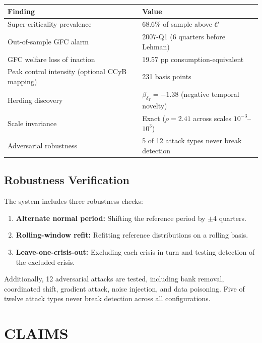 \documentclass[12pt,a4paper]{article}
\begin{document}
\begin{center}
\begin{tabular}{ll}
\toprule
\textbf{Finding} & \textbf{Value} \\
\midrule
Super-criticality prevalence & 68.6\% of sample above $\mathcal{C}$ \\
Out-of-sample GFC alarm & 2007-Q1 (6 quarters before Lehman) \\
GFC welfare loss of inaction & 19.57 pp consumption-equivalent \\
Peak control intensity (optional CCyB mapping) & 231 basis points \\
Herding discovery & $\beta_{\delta_T} = -1.38$ (negative temporal novelty) \\
Scale invariance & Exact ($\rho = 2.41$ across scales $10^{-3}$--$10^3$) \\
Adversarial robustness & 5 of 12 attack types never break detection \\
\bottomrule
\end{tabular}
\end{center}

\subsection{Robustness Verification}

The system includes three robustness checks:
\begin{enumerate}
\item \textbf{Alternate normal period:} Shifting the reference period by 
$\pm 4$ quarters.
\item \textbf{Rolling-window refit:} Refitting reference distributions on 
a rolling basis.
\item \textbf{Leave-one-crisis-out:} Excluding each crisis in turn and 
testing detection of the excluded crisis.
\end{enumerate}

Additionally, 12 adversarial attacks are tested, including bank removal, 
coordinated shift, gradient attack, noise injection, and data poisoning. 
Five of twelve attack types never break detection across all configurations.

\section{CLAIMS}
\end{document}
